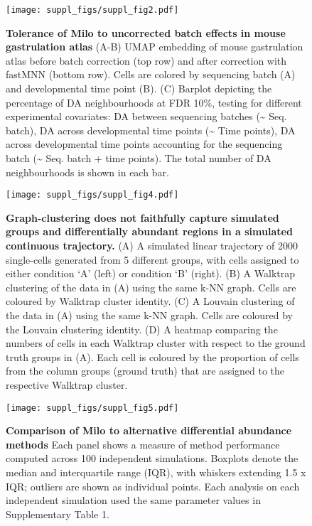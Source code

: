 \documentclass[
]{article}
\begin{document}
\begin{figure}
\centering
\texttt{[image: suppl\_figs/suppl\_fig2.pdf]}
\caption{\label{fig:sup-fig-2}\textbf{Tolerance of Milo to uncorrected batch effects in mouse gastrulation atlas}
(A-B) UMAP embedding of mouse gastrulation atlas before batch correction (top row) and after correction with fastMNN (bottom row). Cells are colored by sequencing batch (A) and developmental time point (B).
(C) Barplot depicting the percentage of DA neighbourhoods at FDR 10\%, testing for different experimental covariates: DA between sequencing batches (\textasciitilde{} Seq. batch), DA across developmental time points (\textasciitilde{} Time points), DA across developmental time points accounting for the sequencing batch (\textasciitilde{} Seq. batch + time points). The total number of DA neighbourhoods is shown in each bar.}
\end{figure}





\begin{figure}
\centering
\texttt{[image: suppl\_figs/suppl\_fig4.pdf]}
\caption{\label{fig:sup-fig-4}\textbf{Graph-clustering does not faithfully capture simulated groups and differentially abundant regions in a simulated continuous trajectory.}
(A) A simulated linear trajectory of 2000 single-cells generated from 5 different groups, with cells assigned to either condition `A' (left) or condition `B' (right).
(B) A Walktrap clustering of the data in (A) using the same k-NN graph. Cells are coloured by Walktrap cluster identity.
(C) A Louvain clustering of the data in (A) using the same k-NN graph. Cells are coloured by the Louvain clustering identity.
(D) A heatmap comparing the numbers of cells in each Walktrap cluster with respect to the ground truth groups in (A). Each cell is coloured by the proportion of cells from the column groups (ground truth) that are assigned to the respective Walktrap cluster.}
\end{figure}







\begin{figure}
\centering
\texttt{[image: suppl\_figs/suppl\_fig5.pdf]}
\caption{\label{fig:sup-fig-5}\textbf{Comparison of Milo to alternative differential abundance methods}
Each panel shows a measure of method performance computed across 100 independent simulations. Boxplots denote the median and interquartile range (IQR), with whiskers extending 1.5 x IQR; outliers are shown as individual points. Each analysis on each independent simulation used the same parameter values in Supplementary Table 1.}
\end{figure}
\end{document}
